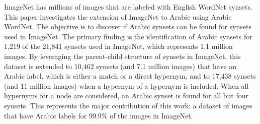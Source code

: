 ImageNet has millions of images that are labeled with English WordNet synsets. This paper investigates the extension of ImageNet to Arabic using Arabic WordNet. The objective is to discover if Arabic synsets can be found for synsets used in ImageNet. The primary finding is the identification of Arabic synsets for 1,219 of the 21,841 synsets used in ImageNet, which represents 1.1 million images. By leveraging the parent-child structure of synsets in ImageNet, this dataset is extended to 10,462 synsets (and 7.1 million images) that have an Arabic label, which is either a match or a direct hypernym, and to 17,438 synsets (and 11 million images) when a hypernym of a hypernym is included. When all hypernyms for a node are considered, an Arabic synset is found for all but four synsets. This represents the major contribution of this work: a dataset of images that have Arabic labels for 99.9\% of the images in ImageNet.
